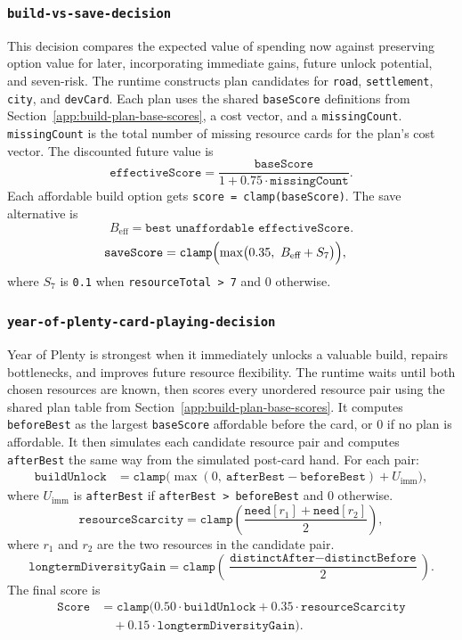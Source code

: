 \documentclass[letter,  12 pt]{article}
\begin{document}
\subsubsection{\texttt{build-vs-save-decision}}
\label{app:task-build-vs-save-decision}
This decision compares the expected value of spending now against preserving option value for later, incorporating immediate gains, future unlock potential, and seven-risk.
The runtime constructs plan candidates for \texttt{road}, \texttt{settlement}, \texttt{city}, and \texttt{devCard}. Each plan uses the shared \texttt{baseScore} definitions from Section~\ref{app:build-plan-base-scores}, a cost vector, and a \texttt{missingCount}. \texttt{missingCount} is the total number of missing resource cards for the plan's cost vector. The discounted future value is
\[
\texttt{effectiveScore} = \frac{\texttt{baseScore}}{1 + 0.75 \cdot \texttt{missingCount}}.
\]
Each affordable build option gets \texttt{score = clamp(baseScore)}. The save alternative is
\[
B_{\text{eff}} = \texttt{best unaffordable effectiveScore}.
\]
\[
\begin{aligned}
\texttt{saveScore}
&= \texttt{clamp}\Bigl(
\max\bigl(0.35,\ B_{\text{eff}} + S_7\bigr)
\Bigr),
\end{aligned}
\]
where $S_7$ is \texttt{0.1} when \texttt{resourceTotal > 7} and $0$ otherwise.

\subsubsection{\texttt{year-of-plenty-card-playing-decision}}
\label{app:task-year-of-plenty-card-playing-decision}
Year of Plenty is strongest when it immediately unlocks a valuable build, repairs bottlenecks, and improves future resource flexibility.
The runtime waits until both chosen resources are known, then scores every unordered resource pair using the shared plan table from Section~\ref{app:build-plan-base-scores}. It computes \texttt{beforeBest} as the largest \texttt{baseScore} affordable before the card, or $0$ if no plan is affordable. It then simulates each candidate resource pair and computes \texttt{afterBest} the same way from the simulated post-card hand. For each pair:
\[
\begin{aligned}
\texttt{buildUnlock}
&= \texttt{clamp}\bigl(
\max(0,\ \texttt{afterBest} - \texttt{beforeBest}) + U_{\text{imm}}
\bigr),
\end{aligned}
\]
where $U_{\text{imm}}$ is \texttt{afterBest} if \texttt{afterBest > beforeBest} and $0$ otherwise.
\[
\texttt{resourceScarcity}
= \texttt{clamp}\left(\frac{\texttt{need}[r_1] + \texttt{need}[r_2]}{2}\right),
\]
where $r_1$ and $r_2$ are the two resources in the candidate pair.
\[
\texttt{longtermDiversityGain}
= \texttt{clamp}\left(\frac{\texttt{distinctAfter} - \texttt{distinctBefore}}{2}\right).
\]
The final score is
\[
\begin{aligned}
\texttt{Score}
&= \texttt{clamp}(
0.50 \cdot \texttt{buildUnlock}
+ 0.35 \cdot \texttt{resourceScarcity} \\
&\quad + 0.15 \cdot \texttt{longtermDiversityGain}).
\end{aligned}
\]
\end{document}
